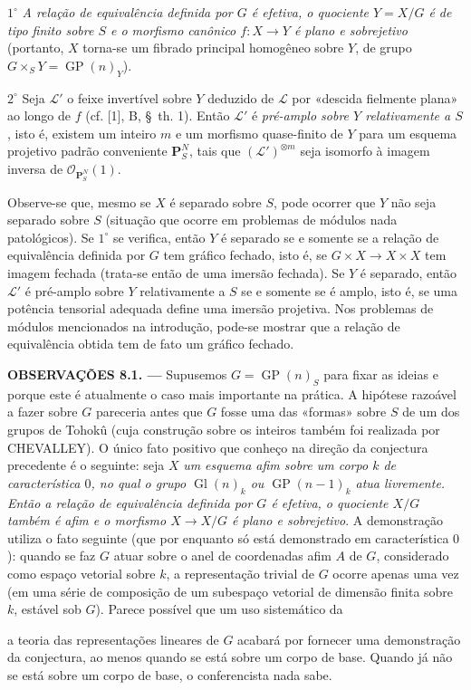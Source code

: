 \documentclass[11pt,twoside,openany]{book}
\numberwithin{equation}{section}
\newcommand{\src}[1]{%
  \phantomsection\hypertarget{src:#1}{}%
  \marginpar{\raggedleft\footnotesize\sffamily #1}%
}
\theoremstyle{plain}
\theoremstyle{definition}
\theoremstyle{remark}
\newcommand{\FgaUnitKey}{frontmatter}
\renewcommand{\src}[1]{%
  \phantomsection\hypertarget{src:\FgaUnitKey:#1}{}%
  \marginpar{\raggedleft\footnotesize\sffamily #1}%
}
\begin{document}
\smallskip
\noindent $1^\circ$ \emph{A relação de equivalência definida por $G$ é
efetiva, o quociente $Y=X/G$ é de tipo finito sobre $S$ e o morfismo canônico
$f:X\to Y$ é plano e sobrejetivo} (portanto, $X$ torna-se um fibrado principal
homogêneo sobre $Y$, de grupo
$G\times_S Y=\operatorname{GP}(n)_Y$).

\smallskip
\noindent $2^\circ$ Seja $\mathcal L'$ o feixe invertível sobre $Y$ deduzido
de $\mathcal L$ por «descida fielmente plana» ao longo de $f$ (cf. [1], B,
\S~th. 1). Então $\mathcal L'$ é \emph{pré-amplo sobre $Y$ relativamente a
$S$}, isto é, existem um inteiro $m$ e um morfismo quase-finito de $Y$ para um
esquema projetivo padrão conveniente $\mathbf P_S^N$, tais que
$(\mathcal L')^{\otimes m}$ seja isomorfo à imagem inversa de
$\mathcal O_{\mathbf P_S^N}(1)$.

Observe-se que, mesmo se $X$ é separado sobre $S$, pode ocorrer que $Y$ não
seja separado sobre $S$ (situação que ocorre em problemas de módulos nada
patológicos). Se $1^\circ$ se verifica, então $Y$ é separado se e somente se a
relação de equivalência definida por $G$ tem gráfico fechado, isto é, se
$G\times X\to X\times X$ tem imagem fechada (trata-se então de uma imersão
fechada). Se $Y$ é separado, então $\mathcal L'$ é pré-amplo sobre $Y$
relativamente a $S$ se e somente se é amplo, isto é, se uma potência tensorial
adequada define uma imersão projetiva. Nos problemas de módulos mencionados na
introdução, pode-se mostrar que a relação de equivalência obtida tem de fato um
gráfico fechado.

\medskip
\noindent\textbf{OBSERVAÇÕES 8.1. ---} Supusemos
$G=\operatorname{GP}(n)_S$ para fixar as ideias e porque este é atualmente o
caso mais importante na prática. A hipótese razoável a fazer sobre $G$
pareceria antes que $G$ fosse uma das «formas» sobre $S$ de um dos grupos de
Tohokû (cuja construção sobre os inteiros também foi realizada por CHEVALLEY).
O único fato positivo que conheço na direção da conjectura precedente é o
seguinte: seja $X$ \emph{um esquema afim sobre um corpo $k$ de característica
$0$, no qual o grupo $\operatorname{Gl}(n)_k$ ou
$\operatorname{GP}(n-1)_k$ atua livremente. Então a relação de equivalência
definida por $G$ é efetiva, o quociente $X/G$ também é afim e o morfismo
$X\to X/G$ é plano e sobrejetivo}. A demonstração utiliza o fato seguinte (que
por enquanto só está demonstrado em característica $0$): quando se faz $G$
atuar sobre o anel de coordenadas afim $A$ de $G$, considerado como espaço
vetorial sobre $k$, a representação trivial de $G$ ocorre apenas uma vez (em
uma série de composição de um subespaço vetorial de dimensão finita sobre $k$,
estável sob $G$). Parece possível que um uso sistemático da
\src{118}
a teoria das representações lineares de $G$ acabará por fornecer uma
demonstração da conjectura, ao menos quando se está sobre um corpo de base.
Quando já não se está sobre um corpo de base, o conferencista nada sabe.
\end{document}
